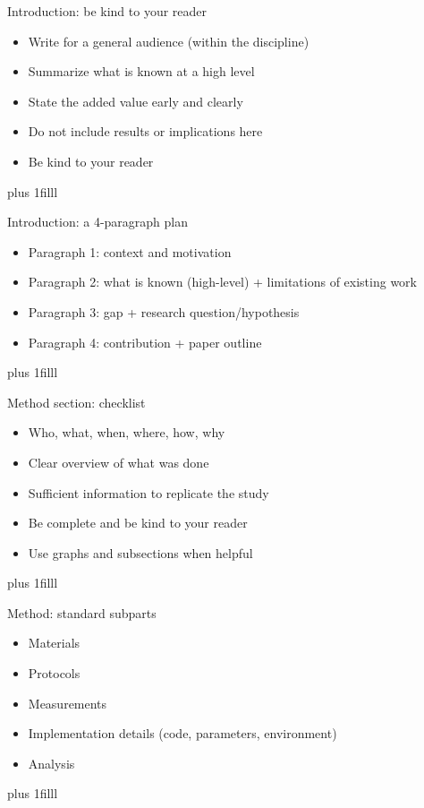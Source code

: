 \documentclass[aspectratio=169]{beamer}
\newcommand{\btVFill}{\vskip0pt plus 1filll}
\begin{document}
\begin{frame}{Introduction: be kind to your reader}
  \begin{itemize}
    \item Write for a general audience (within the discipline)
    \item Summarize what is known at a high level
    \item State the added value early and clearly
    \item Do not include results or implications here
    \item Be kind to your reader
  \end{itemize}
   \btVFill
\end{frame}

\begin{frame}{Introduction: a 4-paragraph plan}
  \begin{itemize}
    \item Paragraph 1: context and motivation
    \item Paragraph 2: what is known (high-level) + limitations of existing work
    \item Paragraph 3: gap + research question/hypothesis
    \item Paragraph 4: contribution + paper outline
  \end{itemize}
  \btVFill
\end{frame}

\begin{frame}{Method section: checklist}
  \begin{itemize}
    \item Who, what, when, where, how, why
    \item Clear overview of what was done
    \item Sufficient information to replicate the study
    \item Be complete and be kind to your reader
    \item Use graphs and subsections when helpful
  \end{itemize}
  \btVFill
\end{frame}

\begin{frame}{Method: standard subparts}
  \begin{itemize}
    \item Materials
    \item Protocols
    \item Measurements
    \item Implementation details (code, parameters, environment)
    \item Analysis
  \end{itemize}
  \btVFill
\end{frame}
\end{document}
